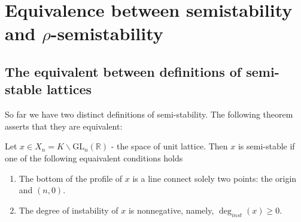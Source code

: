 \chapter{Equivalence between semistability and $\rho$-semistability}
\section{The equivalent between definitions of semi-stable lattices}
So far we have two distinct definitions of semi-stability. The following theorem asserts that they are equivalent:
\begin{prop}\label{semi-stable-equiv}
    Let $x \in X_n = K \backslash \text{GL}_n(\mathbb{R})$ - the space of unit lattice. Then $x$ is semi-stable if one of the following equaivalent
    conditions holds
    \begin{enumerate}
        \item The bottom of the profile of $x$ is a line connect solely two points: the origin and $(n,0)$.
        \item The degree of instability of $x$ is nonnegative, namely, $\deg_{inst}(x) \ge 0$.
    \end{enumerate}
\end{prop}
